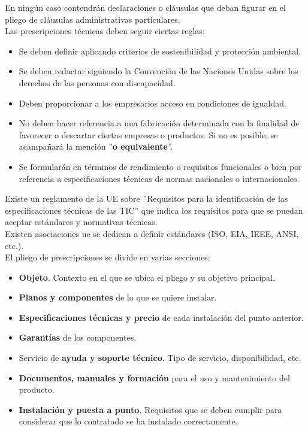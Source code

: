 \documentclass[12pt,spanish]{article}
\begin{document}
En ningún caso contendrán declaraciones o cláusulas que deban figurar en el pliego de cláusulas administrativas particulares.\\

Las prescripciones técnicas deben seguir ciertas reglas:

\begin{itemize}
	\item Se deben definir aplicando criterios de sostenibilidad y protección ambiental.
	\item Se deben redactar siguiendo la Convención de las Naciones Unidas sobre los derechos de las personas con discapacidad.
	\item Deben proporcionar a los empresarios acceso en condiciones de igualdad.
	\item No deben hacer referencia a una fabricación determinada con la finalidad de favorecer o descartar ciertas empresas o productos. Si no es posible, se acampañará la mención ''\textbf{o equivalente}''.
	\item Se formularán en términos de rendimiento o requisitos funcionales o bien por referencia a especificaciones técnicas de normas nacionales o internacionales.
\end{itemize}

Existe un reglamento de la UE sobre ''Requisitos para la identificación de las especificaciones técnicas de las TIC'' que indica los requisitos para que se puedan aceptar estándares y normativas técnicas.\\

Existen asociaciones ue se dedican a definir estándares (ISO, EIA, IEEE, ANSI, etc.).\\

El pliego de prescripciones se divide en varias secciones:

\begin{itemize}
	\item \textbf{Objeto}. Contexto en el que se ubica el pliego y su objetivo principal.
	\item \textbf{Planos y componentes} de lo que se quiere instalar.
	\item \textbf{Especificaciones técnicas y precio} de cada instalación del punto anterior.
	\item \textbf{Garantías} de los componentes.
	\item Servicio de \textbf{ayuda y soporte técnico}. Tipo de servicio, disponibilidad, etc.
	\item \textbf{Documentos, manuales y formación} para el uso y mantenimiento del producto.
	\item \textbf{Instalación y puesta a punto}. Requisitos que se deben cumplir para considerar que lo contratado se ha instalado correctamente.
\end{itemize}
\end{document}

